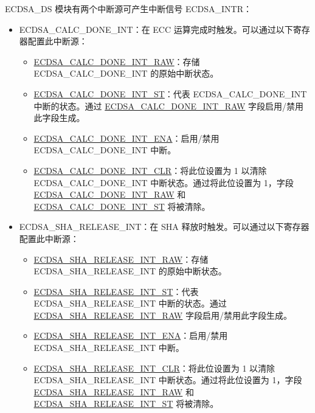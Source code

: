 \documentclass[main\_\_CN.tex]{subfiles}
\begin{document}
ECDSA\_DS 模块有两个中断源可产生中断信号 ECDSA\_INTR：
\begin{itemize}
	\item \label{int:ECDSACALCDONEINT}ECDSA\_CALC\_DONE\_INT：在 ECC 运算完成时触发。可以通过以下寄存器配置此中断源：
	      \begin{itemize}
		      \item \hyperref[fielddesc:ECDSACALCDONEINTRAW]{ECDSA\_CALC\_DONE\_INT\_RAW}：存储 ECDSA\_CALC\_DONE\_INT 的原始中断状态。
		      \item \hyperref[fielddesc:ECDSACALCDONEINTST]{ECDSA\_CALC\_DONE\_INT\_ST}：代表 ECDSA\_CALC\_DONE\_INT 中断的状态。通过 \hyperref[fielddesc:ECDSACALCDONEINTRAW]{ECDSA\_CALC\_DONE\_INT\_RAW} 字段启用/禁用此字段生成。
		      \item \hyperref[fielddesc:ECDSACALCDONEINTENA]{ECDSA\_CALC\_DONE\_INT\_ENA}：启用/禁用 ECDSA\_CALC\_DONE\_INT 中断。
		      \item \hyperref[fielddesc:ECDSACALCDONEINTCLR]{ECDSA\_CALC\_DONE\_INT\_CLR}：将此位设置为 1 以清除 ECDSA\_CALC\_DONE\_INT 中断状态。通过将此位设置为 1，字段 \hyperref[fielddesc:ECDSACALCDONEINTRAW]{ECDSA\_CALC\_DONE\_INT\_RAW} 和 \hyperref[fielddesc:ECDSACALCDONEINTST]{ECDSA\_CALC\_DONE\_INT\_ST} 将被清除。
	      \end{itemize}
	\item \label{int:ECDSASHARELEASEINT}ECDSA\_SHA\_RELEASE\_INT：在 SHA 释放时触发。可以通过以下寄存器配置此中断源：
	      \begin{itemize}
		      \item \hyperref[fielddesc:ECDSASHARELEASEINTRAW]{ECDSA\_SHA\_RELEASE\_INT\_RAW}：存储 ECDSA\_SHA\_RELEASE\_INT 的原始中断状态。
		      \item \hyperref[fielddesc:ECDSASHARELEASEINTST]{ECDSA\_SHA\_RELEASE\_INT\_ST}：代表 ECDSA\_SHA\_RELEASE\_INT 中断的状态。通过 \hyperref[fielddesc:ECDSASHARELEASEINTRAW]{ECDSA\_SHA\_RELEASE\_INT\_RAW} 字段启用/禁用此字段生成。
		      \item \hyperref[fielddesc:ECDSASHARELEASEINTENA]{ECDSA\_SHA\_RELEASE\_INT\_ENA}：启用/禁用 ECDSA\_SHA\_RELEASE\_INT 中断。
		      \item \hyperref[fielddesc:ECDSASHARELEASEINTCLR]{ECDSA\_SHA\_RELEASE\_INT\_CLR}：将此位设置为 1 以清除 ECDSA\_SHA\_RELEASE\_INT 中断状态。通过将此位设置为 1，字段 \hyperref[fielddesc:ECDSASHARELEASEINTRAW]{ECDSA\_SHA\_RELEASE\_INT\_RAW} 和 \hyperref[fielddesc:ECDSASHARELEASEINTST]{ECDSA\_SHA\_RELEASE\_INT\_ST} 将被清除。
	      \end{itemize}
\end{itemize}
\end{document}

